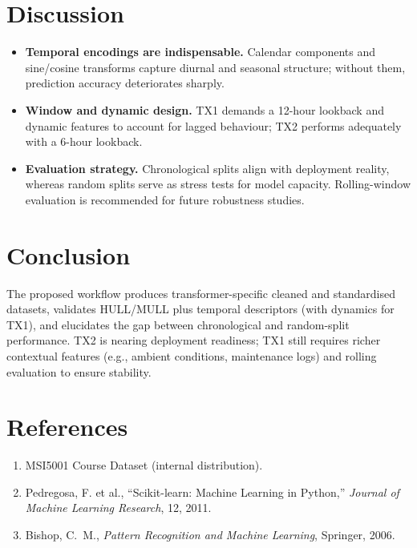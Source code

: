 \documentclass[11pt]{article}
\begin{document}
\section{Discussion}
\begin{itemize}
    \item \textbf{Temporal encodings are indispensable.} Calendar components and sine/cosine transforms capture diurnal and seasonal structure; without them, prediction accuracy deteriorates sharply.
    \item \textbf{Window and dynamic design.} TX1 demands a 12-hour lookback and dynamic features to account for lagged behaviour; TX2 performs adequately with a 6-hour lookback.
    \item \textbf{Evaluation strategy.} Chronological splits align with deployment reality, whereas random splits serve as stress tests for model capacity. Rolling-window evaluation is recommended for future robustness studies.
\end{itemize}

\section{Conclusion}
The proposed workflow produces transformer-specific cleaned and standardised datasets, validates HULL/MULL plus temporal descriptors (with dynamics for TX1), and elucidates the gap between chronological and random-split performance. TX2 is nearing deployment readiness; TX1 still requires richer contextual features (e.g., ambient conditions, maintenance logs) and rolling evaluation to ensure stability.

\section*{References}
\begin{enumerate}
    \item MSI5001 Course Dataset (internal distribution).
    \item Pedregosa, F. et al., ``Scikit-learn: Machine Learning in Python,'' \textit{Journal of Machine Learning Research}, 12, 2011.
    \item Bishop, C.~M., \textit{Pattern Recognition and Machine Learning}, Springer, 2006.
\end{enumerate}

\appendix
\end{document}
